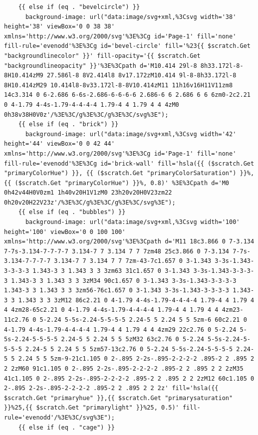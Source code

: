 \documentclass[11pt]{article}
\begin{document}
\begin{enumerate}
\begin{verbatim}
    {{ else if (eq . "bevelcircle") }}
      background-image: url("data:image/svg+xml,%3Csvg width='38' height='38' viewBox='0 0 38 38' xmlns='http://www.w3.org/2000/svg'%3E%3Cg id='Page-1' fill='none' fill-rule='evenodd'%3E%3Cg id='bevel-circle' fill='%23{{ $scratch.Get "backgroundlinecolor" }}' fill-opacity='{{ $scratch.Get "backgroundlineopacity" }}'%3E%3Cpath d='M10.414 29l-8 8h33.172l-8-8H10.414zM9 27.586l-8 8V2.414l8 8v17.172zM10.414 9l-8-8h33.172l-8 8H10.414zM29 10.414l8-8v33.172l-8-8V10.414zM11 11h16v16H11V11zm8 14c3.314 0 6-2.686 6-6s-2.686-6-6-6-6 2.686-6 6 2.686 6 6 6zm0-2c2.21 0 4-1.79 4-4s-1.79-4-4-4-4 1.79-4 4 1.79 4 4 4zM0 0h38v38H0V0z'/%3E%3C/g%3E%3C/g%3E%3C/svg%3E");
    {{ else if (eq . "brick") }}
      background-image: url("data:image/svg+xml,%3Csvg width='42' height='44' viewBox='0 0 42 44' xmlns='http://www.w3.org/2000/svg'%3E%3Cg id='Page-1' fill='none' fill-rule='evenodd'%3E%3Cg id='brick-wall' fill='hsla({{ ($scratch.Get "primaryColorHue") }}, {{ ($scratch.Get "primaryColorSaturation") }}%, {{ ($scratch.Get "primaryColorHue") }}%, 0.8)' %3E%3Cpath d='M0 0h42v44H0V0zm1 1h40v20H1V1zM0 23h20v20H0V23zm22 0h20v20H22V23z'/%3E%3C/g%3E%3C/g%3E%3C/svg%3E");
    {{ else if (eq . "bubbles") }}
      background-image: url("data:image/svg+xml,%3Csvg width='100' height='100' viewBox='0 0 100 100' xmlns='http://www.w3.org/2000/svg'%3E%3Cpath d='M11 18c3.866 0 7-3.134 7-7s-3.134-7-7-7-7 3.134-7 7 3.134 7 7 7zm48 25c3.866 0 7-3.134 7-7s-3.134-7-7-7-7 3.134-7 7 3.134 7 7 7zm-43-7c1.657 0 3-1.343 3-3s-1.343-3-3-3-3 1.343-3 3 1.343 3 3 3zm63 31c1.657 0 3-1.343 3-3s-1.343-3-3-3-3 1.343-3 3 1.343 3 3 3zM34 90c1.657 0 3-1.343 3-3s-1.343-3-3-3-3 1.343-3 3 1.343 3 3 3zm56-76c1.657 0 3-1.343 3-3s-1.343-3-3-3-3 1.343-3 3 1.343 3 3 3zM12 86c2.21 0 4-1.79 4-4s-1.79-4-4-4-4 1.79-4 4 1.79 4 4 4zm28-65c2.21 0 4-1.79 4-4s-1.79-4-4-4-4 1.79-4 4 1.79 4 4 4zm23-11c2.76 0 5-2.24 5-5s-2.24-5-5-5-5 2.24-5 5 2.24 5 5 5zm-6 60c2.21 0 4-1.79 4-4s-1.79-4-4-4-4 1.79-4 4 1.79 4 4 4zm29 22c2.76 0 5-2.24 5-5s-2.24-5-5-5-5 2.24-5 5 2.24 5 5 5zM32 63c2.76 0 5-2.24 5-5s-2.24-5-5-5-5 2.24-5 5 2.24 5 5 5zm57-13c2.76 0 5-2.24 5-5s-2.24-5-5-5-5 2.24-5 5 2.24 5 5 5zm-9-21c1.105 0 2-.895 2-2s-.895-2-2-2-2 .895-2 2 .895 2 2 2zM60 91c1.105 0 2-.895 2-2s-.895-2-2-2-2 .895-2 2 .895 2 2 2zM35 41c1.105 0 2-.895 2-2s-.895-2-2-2-2 .895-2 2 .895 2 2 2zM12 60c1.105 0 2-.895 2-2s-.895-2-2-2-2 .895-2 2 .895 2 2 2z' fill='hsla({{ $scratch.Get "primaryhue" }},{{ $scratch.Get "primarysaturation" }}%25,{{ $scratch.Get "primarylight" }}%25, 0.5)' fill-rule='evenodd'/%3E%3C/svg%3E");
    {{ else if (eq . "cage") }}

\end{verbatim}
\end{enumerate}
\end{document}
